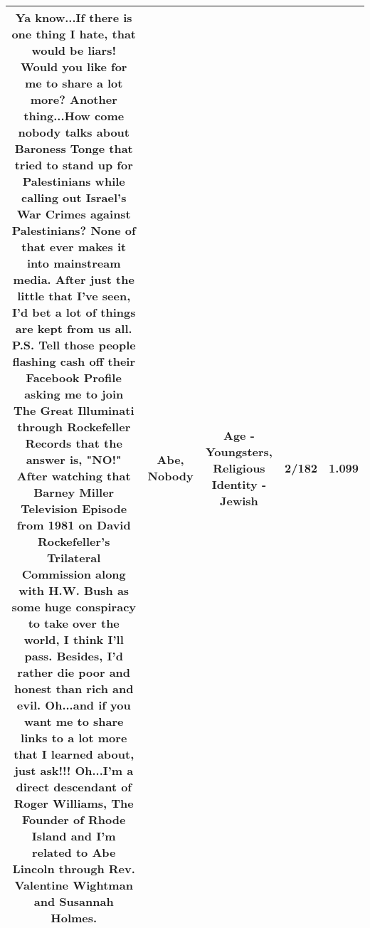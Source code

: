 \documentclass[11pt]{article}
\newlength\mylength
\begin{document}
\begin{center}
\begin{longtable}{|C{.65\mylength}|C{.30\mylength}|C{.12\mylength}|C{.12\mylength}|C{.12\mylength}|}
  \small Ya know...If there is one thing I hate, that would be liars! Would you like for me to share a lot more? Another thing...How come \textbf{nobody} talks about Baroness Tonge that tried to stand up for Palestinians while calling out Israel's War Crimes against Palestinians? None of that ever makes it into mainstream media. After just the little that I've seen, I'd bet a lot of things are kept from us all. P.S. Tell those people flashing cash off their Facebook Profile asking me to join The Great Illuminati through Rockefeller Records that the answer is, "NO!" After watching that Barney Miller Television Episode from 1981 on David Rockefeller's Trilateral Commission along with H.W. Bush as some huge conspiracy to take over the world, I think I'll pass. Besides, I'd rather die poor and honest than rich and evil. Oh...and if you want me to share links to a lot more that I learned about, just ask!!! Oh...I'm a direct descendant of Roger Williams, The Founder of Rhode Island and I'm related to \textbf{Abe} Lincoln through Rev. Valentine Wightman and Susannah Holmes.\normalsize   & Abe, Nobody & Age - Youngsters, Religious Identity - Jewish & 2/182 & 1.099 \\  \hline

\end{longtable}
\end{center}
\end{document}
